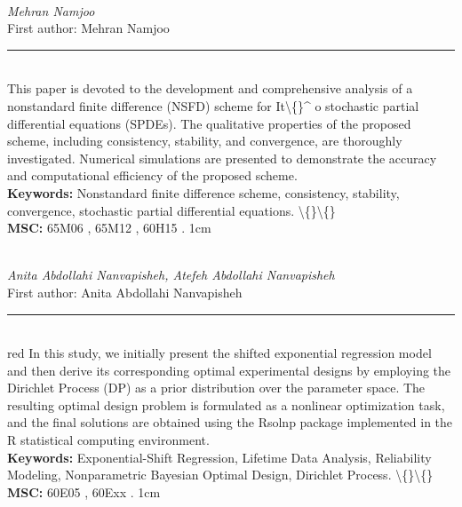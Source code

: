 \documentclass[10pt,twoside]{article}
\begin{document}
\noindent\begin{minipage}[t][\textheight]{\textwidth}
\\[0.35em]
{\itshape Mehran Namjoo}\\[0.2em]
{\footnotesize First author: Mehran Namjoo}\\[0.45em]
\noindent\rule{\textwidth}{0.3pt}\\[0.4em]
{\footnotesize  This paper is devoted to the development and comprehensive analysis of a nonstandard finite difference (NSFD) scheme for It\textbackslash\{\}\textasciicircum{} o stochastic partial differential equations (SPDEs). The qualitative properties of the proposed scheme, including consistency, stability, and convergence, are thoroughly investigated. Numerical simulations are presented to demonstrate the accuracy and computational efficiency of the proposed scheme.}\\[0.4em]
{\footnotesize\bfseries Keywords:} {\footnotesize Nonstandard finite difference scheme, consistency, stability, convergence, stochastic partial differential equations. \textbackslash\{\}\textbackslash\{\}}\\[0.15em]
{\footnotesize\bfseries MSC:} {\footnotesize 65M06 , 65M12 , 60H15 . 1cm}\\
\vfill
\end{minipage}
\newpage

\noindent\begin{minipage}[t][\textheight]{\textwidth}
\\[0.35em]
{\itshape Anita Abdollahi Nanvapisheh, Atefeh Abdollahi Nanvapisheh}\\[0.2em]
{\footnotesize First author: Anita Abdollahi Nanvapisheh}\\[0.45em]
\noindent\rule{\textwidth}{0.3pt}\\[0.4em]
{\footnotesize  red In this study, we initially present the shifted exponential regression model and then derive its corresponding optimal experimental designs by employing the Dirichlet Process (DP) as a prior distribution over the parameter space. The resulting optimal design problem is formulated as a nonlinear optimization task, and the final solutions are obtained using the Rsolnp package implemented in the R statistical computing environment.}\\[0.4em]
{\footnotesize\bfseries Keywords:} {\footnotesize Exponential-Shift Regression, Lifetime Data Analysis, Reliability Modeling, Nonparametric Bayesian Optimal Design, Dirichlet Process. \textbackslash\{\}\textbackslash\{\}}\\[0.15em]
{\footnotesize\bfseries MSC:} {\footnotesize 60E05 , 60Exx . 1cm}\\
\vfill
\end{minipage}
\newpage
\end{document}
